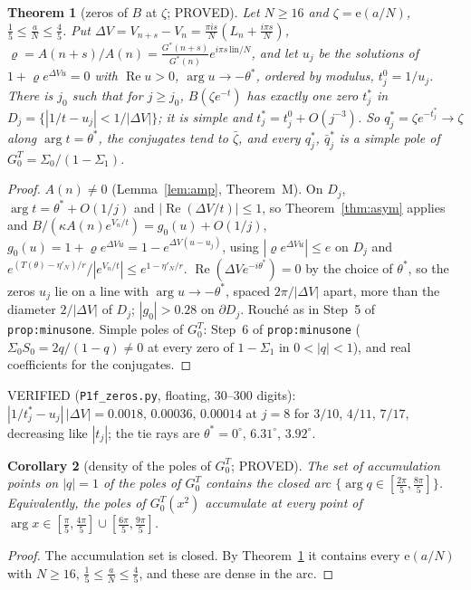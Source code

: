 \documentclass[11pt]{article}
\newtheorem{theorem}{Theorem}\newtheorem{lemma}[theorem]{Lemma}\newtheorem{proposition}[theorem]{Proposition}
\newtheorem{corollary}[theorem]{Corollary}
\theoremstyle{definition}\newtheorem{definition}[theorem]{Definition}
\theoremstyle{remark}\newtheorem{remark}[theorem]{Remark}
\newcommand{\e}{\mathrm{e}}
\begin{document}
\begin{theorem}[zeros of $B$ at $\zeta$; PROVED]\label{thm:B}
Let $N\ge16$ and $\zeta=\e(a/N)$, $\frac15\le\frac aN\le\frac45$. Put $\Delta V=V_{n+s}-V_n=\frac{\pi is}N(L_n+\frac{i\pi s}N)$, $\varrho=A(n+s)/A(n)=\frac{G^*(n+s)}{G^*(n)}e^{i\pi s\,\mathrm{lin}/N}$, and let $u_j$ be the solutions of $1+\varrho e^{\Delta Vu}=0$ with $\operatorname{Re}u>0$, $\arg u\to-\theta^*$, ordered by modulus, $t^0_j=1/u_j$. There is $j_0$ such that for $j\ge j_0$, $B(\zeta e^{-t})$ has exactly one zero $t^*_j$ in $D_j=\{|1/t-u_j|<1/|\Delta V|\}$; it is simple and $t^*_j=t^0_j+O(j^{-3})$. So $q^*_j=\zeta e^{-t^*_j}\to\zeta$ along $\arg t=\theta^*$, the conjugates tend to $\bar\zeta$, and every $q^*_j$, $\bar q^*_j$ is a simple pole of $G^T_0=\Sigma_0/(1-\Sigma_1)$.
\end{theorem}
\begin{proof}
$A(n)\ne0$ (Lemma~\ref{lem:amp}, Theorem~M). On $D_j$, $\arg t=\theta^*+O(1/j)$ and $|\operatorname{Re}(\Delta V/t)|\le1$, so Theorem~\ref{thm:asym} applies and $B/(\kappa A(n)e^{V_n/t})=g_0(u)+O(1/j)$, $g_0(u)=1+\varrho e^{\Delta Vu}=1-e^{\Delta V(u-u_j)}$, using $|\varrho e^{\Delta Vu}|\le e$ on $D_j$ and $e^{(T(\theta)-\eta'_N)/r}/|e^{V_n/t}|\le e^{1-\eta'_N/r}$. $\operatorname{Re}(\Delta Ve^{-i\theta^*})=0$ by the choice of $\theta^*$, so the zeros $u_j$ lie on a line with $\arg u\to-\theta^*$, spaced $2\pi/|\Delta V|$ apart, more than the diameter $2/|\Delta V|$ of $D_j$; $|g_0|>0.28$ on $\partial D_j$. Rouch\'e as in Step~5 of \texttt{prop:minusone}. Simple poles of $G^T_0$: Step~6 of \texttt{prop:minusone} ($\Sigma_0S_0=2q/(1-q)\ne0$ at every zero of $1-\Sigma_1$ in $0<|q|<1$), and real coefficients for the conjugates.
\end{proof}
VERIFIED (\texttt{P1f\_zeros.py}, floating, 30--300 digits): $|1/t^*_j-u_j|\,|\Delta V|=0.0018,\,0.00036,\,0.00014$ at $j=8$ for $3/10$, $4/11$, $7/17$, decreasing like $|t_j|$; the tie rays are $\theta^*=0^\circ$, $6.31^\circ$, $3.92^\circ$.

\begin{corollary}[density of the poles of $G^T_0$; PROVED]\label{cor:dense}
The set of accumulation points on $|q|=1$ of the poles of $G^T_0$ contains the closed arc $\{\arg q\in[\frac{2\pi}5,\frac{8\pi}5]\}$. Equivalently, the poles of $G^T_0(x^2)$ accumulate at every point of $\arg x\in[\frac\pi5,\frac{4\pi}5]\cup[\frac{6\pi}5,\frac{9\pi}5]$.
\end{corollary}
\begin{proof}
The accumulation set is closed. By Theorem~\ref{thm:B} it contains every $\e(a/N)$ with $N\ge16$, $\frac15\le\frac aN\le\frac45$, and these are dense in the arc.
\end{proof}
\end{document}
